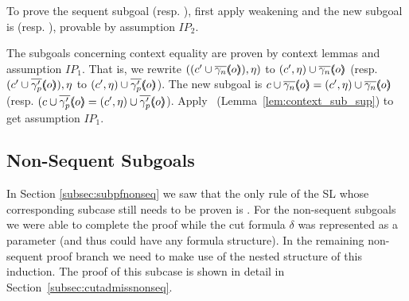 To prove the sequent subgoal  (resp. ), first apply weakening and the new subgoal is \seqsl[\inddyncon{}]{\eta} (resp. \seqsl[\inddyncon{}]{\eta}), provable by assumption $\mathit{IP}_2$.

The subgoals concerning context equality are proven by context lemmas and assumption $\mathit{IP}_1$. That is, we rewrite $((c'{} \cup \overline{\gamma_n} (\hspace{-0.35em} \langle o \rangle \hspace{-0.35em})) , \eta)$ to $(c'{} , \eta) \cup \overline{\gamma_n} (\hspace{-0.35em} \langle o \rangle \hspace{-0.35em})$ (resp. $(c'{} \cup \overline{\gamma'_p} (\hspace{-0.35em} \langle o \rangle \hspace{-0.35em})) , \eta$ to $(c'{} , \eta) \cup \overline{\gamma'_p} (\hspace{-0.35em} \langle o \rangle \hspace{-0.35em})$). The new subgoal is $c \cup \overline{\gamma_n} (\hspace{-0.35em} \langle o \rangle \hspace{-0.35em}) = (c'{} , \eta) \cup \overline{\gamma_n} (\hspace{-0.35em} \langle o \rangle \hspace{-0.35em})$ (resp. $(c \cup \overline{\gamma'_p} (\hspace{-0.35em} \langle o \rangle \hspace{-0.35em}) = (c'{} , \eta) \cup \overline{\gamma'_p} (\hspace{-0.35em} \langle o \rangle \hspace{-0.35em})$). Apply~ (Lemma~\ref{lem:context_sub_sup}) to get assumption $\mathit{IP}_1$.



\subsection{Non-Sequent Subgoals}%

In Section \ref{subsec:subpfnonseq} we saw that the only rule of the SL whose corresponding subcase still needs to be proven is \rlnmsinit{}. For the non-sequent subgoals we were able to complete the proof while the cut formula $\delta$ was represented as a parameter (and thus could have any formula structure). In the remaining non-sequent proof branch we need to make use of the nested structure of this induction. The proof of this subcase is shown in detail in Section~\ref{subsec:cutadmissnonseq}.

\bigskip

